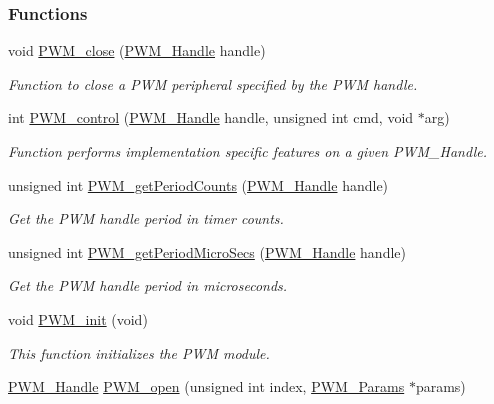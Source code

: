 \subsubsection*{Functions}
\begin{DoxyCompactItemize}
\item 
void \hyperlink{_p_w_m_8h_a0e0f5899b067d27653db566fb148db11}{P\+W\+M\+\_\+close} (\hyperlink{_p_w_m_8h_afdefc765f42bbad4dca246fda6e1354b}{P\+W\+M\+\_\+\+Handle} handle)
\begin{DoxyCompactList}\small\item\em Function to close a P\+W\+M peripheral specified by the P\+W\+M handle. \end{DoxyCompactList}\item 
int \hyperlink{_p_w_m_8h_ade999f5b12997479efa1ac85aaf46ef5}{P\+W\+M\+\_\+control} (\hyperlink{_p_w_m_8h_afdefc765f42bbad4dca246fda6e1354b}{P\+W\+M\+\_\+\+Handle} handle, unsigned int cmd, void $\ast$arg)
\begin{DoxyCompactList}\small\item\em Function performs implementation specific features on a given P\+W\+M\+\_\+\+Handle. \end{DoxyCompactList}\item 
unsigned int \hyperlink{_p_w_m_8h_af7c6d8e045f6f5cc8b978d68bead5b41}{P\+W\+M\+\_\+get\+Period\+Counts} (\hyperlink{_p_w_m_8h_afdefc765f42bbad4dca246fda6e1354b}{P\+W\+M\+\_\+\+Handle} handle)
\begin{DoxyCompactList}\small\item\em Get the P\+W\+M handle period in timer counts. \end{DoxyCompactList}\item 
unsigned int \hyperlink{_p_w_m_8h_a150ccda2b9cb65f8c12d173bba10df53}{P\+W\+M\+\_\+get\+Period\+Micro\+Secs} (\hyperlink{_p_w_m_8h_afdefc765f42bbad4dca246fda6e1354b}{P\+W\+M\+\_\+\+Handle} handle)
\begin{DoxyCompactList}\small\item\em Get the P\+W\+M handle period in microseconds. \end{DoxyCompactList}\item 
void \hyperlink{_p_w_m_8h_aadae3fe77e36cbf9643a22eeb99fb01e}{P\+W\+M\+\_\+init} (void)
\begin{DoxyCompactList}\small\item\em This function initializes the P\+W\+M module. \end{DoxyCompactList}\item 
\hyperlink{_p_w_m_8h_afdefc765f42bbad4dca246fda6e1354b}{P\+W\+M\+\_\+\+Handle} \hyperlink{_p_w_m_8h_ac963beab0c5c6901bf852f175028aeaf}{P\+W\+M\+\_\+open} (unsigned int index, \hyperlink{struct_p_w_m___params}{P\+W\+M\+\_\+\+Params} $\ast$params)

\end{DoxyCompactItemize}
